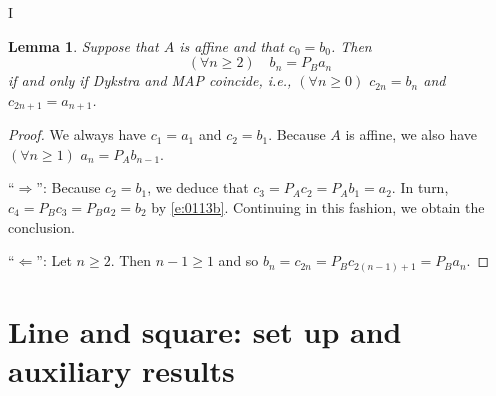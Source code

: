 I\documentclass[12pt]{article}
\newtheorem{lemma}[theorem]{Lemma}
\begin{document}
\begin{lemma}
\label{l:0113b}
Suppose that $A$ is affine and that $c_{0} = b_0$. 
Then 
\begin{equation}
\label{e:0113b}
(\forall n\geq 2) \quad b_n = P_Ba_n
\end{equation}
if and only if 
Dykstra and MAP coincide, i.e.,
$(\forall n\geq 0)$
$c_{2n} = b_n$ and $c_{2n+1} = a_{n+1}$.
\end{lemma}
\begin{proof}
We always have $c_1=a_1$ and $c_2=b_1$. 
Because $A$ is affine, we also have 
$(\forall n\geq 1)$
$a_n = P_Ab_{n-1}$.

``$\Rightarrow$'':
Because $c_{2} = b_1$, we deduce that 
$c_{3} = P_Ac_{2} = P_Ab_1 = a_{2}$.
In turn, $c_{4} = P_Bc_{3} = P_Ba_{2} = b_{2}$ 
by \eqref{e:0113b}.
Continuing in this fashion, we obtain the conclusion.

``$\Leftarrow$'':
Let $n\geq 2$.
Then $n-1\geq 1$ and 
so 
$b_n = c_{2n} = P_Bc_{2(n-1)+1} = P_Ba_n$. 
\end{proof}

\section{Line and square: set up and auxiliary results}

\label{s:aux}
\end{document}
